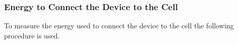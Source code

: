 %
%
%

\subsubsection{Energy to Connect the Device to the Cell}

To measure the energy used to connect the device to the cell the following procedure is used.

